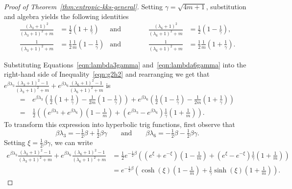\begin{proof}[Proof of Theorem~\ref{thm:entropic-kks-general}]
    Setting $\gamma = \sqrt{4m+1}$, substitution and algebra yields the following identities
    \begin{align}
            \tfrac{(\lambda_3+1)^2}{(\lambda_3+1)^2 + m} & = \tfrac{1}{2}(1+\tfrac{1}{\gamma})
            & \textrm{and} \qquad\qquad
            \tfrac{(\lambda_6+1)^2}{(\lambda_6+1)^2 + m} & = \tfrac{1}{2}(1-\tfrac{1}{\gamma}), \label{eqn:lambda3gamma}\\
            \tfrac{1}{(\lambda_3+1)^2 + m} & = \tfrac{1}{2}\tfrac{1}{m}(1-\tfrac{1}{\gamma})
            & \textrm{and} \qquad\qquad
            \tfrac{1}{(\lambda_6+1)^2 + m} & = \tfrac{1}{2}\tfrac{1}{m}(1+\tfrac{1}{\gamma}).\label{eqn:lambda6gamma}
    \end{align}

    Substituting Equations~\eqref{eqn:lambda3gamma} and~\eqref{eqn:lambda6gamma}
    into the right-hand side of Inequality~\eqref{eqn:g2h2} and rearranging we get that $e^{\beta\lambda_3} \tfrac{(\lambda_3+1)^2-1}{(\lambda_3+1)^2+m} + e^{\beta \lambda_6} \tfrac{(\lambda_6+1)^2-1}{(\lambda_6+1)^2+m}$ is
    \begin{align*}
        =~& e^{\beta\lambda_3} \left(\tfrac{1}{2}(1+\tfrac{1}{\gamma}) - \tfrac{1}{2m}(1-\tfrac{1}{\gamma}) \right)
         + e^{\beta \lambda_6} \left(\tfrac{1}{2}(1-\tfrac{1}{\gamma}) - \tfrac{1}{2m}(1+\tfrac{1}{\gamma}) \right) \\
        =~&
        \tfrac{1}{2}\left(
            (e^{\beta\lambda_3} + e^{\beta\lambda_6})(1-\tfrac{1}{m})
            +
            (e^{\beta\lambda_3} - e^{\beta\lambda_6})\tfrac{1}{\gamma}(1+\tfrac{1}{m})
        \right).
    \end{align*}
    To transform this expression into hyperbolic trig functions,
    first observe that
    \begin{equation}\label{eqn:lambda36beta}
      \beta \lambda_3 = - \tfrac{1}{2} \beta + \tfrac{1}{2}\beta \gamma
      \quad\quad \textrm{and} \quad\quad
      \beta \lambda_6 = - \tfrac{1}{2} \beta - \tfrac{1}{2}\beta \gamma.
    \end{equation}
    Setting $\xi = \tfrac{1}{2}\beta \gamma$, we can write
    \begin{align*}
      e^{\beta\lambda_3} \tfrac{(\lambda_3+1)^2-1}{(\lambda_3+1)^2+m} + e^{\beta \lambda_6} \tfrac{(\lambda_6+1)^2-1}{(\lambda_6+1)^2+m}
      &=
      \tfrac{1}{2}e^{-\tfrac{1}{2}\beta}\left(
          (e^{\xi} + e^{-\xi})(1-\tfrac{1}{m})
          +
          (e^{\xi} - e^{-\xi})\tfrac{1}{\gamma}(1+\tfrac{1}{m}) \right) \\
      &=
         e^{-\tfrac{1}{2}\beta} \left( \cosh(\xi)(1-\tfrac{1}{m}) + \tfrac{1}{\gamma} \sinh(\xi) (1+\tfrac{1}{m}) \right).
    \end{align*}


\end{proof}
